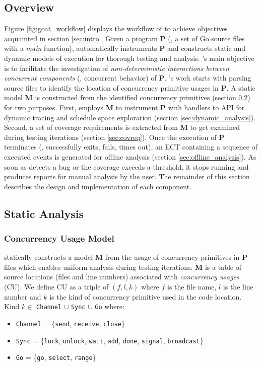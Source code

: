 \subsection{Overview}
\label{sec:overview}
Figure \ref{fig:goat_workflow} displays the workflow of \goat to achieve objectives acquainted in section \ref{sec:intro}.
%
Given a program \textbf{P} (\ie, a set of Go source files with a \textit{main} function), \goat automatically instruments \textbf{P} and constructs static and dynamic models of execution for thorough testing and analysis.
%
\goat's main objective is to facilitate the investigation of \textit{non-deterministic interactions between concurrent components} (\ie, concurrent behavior) of \textbf{P}.
%
\goat's work starts with parsing source files to identify the location of concurrency primitive usages in \textbf{P}.
%
A static model \textbf{M} is constructed from the identified concurrency primitives (section \ref{sec:static_analysis}) for two purposes.
%
First, \goat employs \textbf{M} to instrument \textbf{P} with handlers to \goat API for dynamic tracing and schedule space exploration (section \ref{sec:dynamic_analysis}).
%
Second, a set of coverage requirements is extracted from \textbf{M} to get examined during testing iterations (section \ref{sec:covreq}).
%
Once the execution of \textbf{P} terminates (\eg, successfully exits, fails, times out), an ECT containing a sequence of executed events is generated for offline analysis (section \ref{sec:offline_analysis}).
%
As soon as \goat detects a bug or the coverage exceeds a threshold, it stops running and produces reports for manual analysis by the user.
%
The remainder of this section describes the design and implementation of each component.

\subsection{Static Analysis}
\label{sec:static_analysis}

\subsubsection{Concurrency Usage Model}
\goat statically constructs a model \textbf{M} from the usage of concurrency primitives in \textbf{P} files which enables uniform analysis during testing iterations.
%
\textbf{M} is a table of source locations (files and line numbers) associated with \textit{concurrency usages} (CU).
%
We define CU as a triple of $(f,l,k)$ where $f$ is the file name, $l$ is the line number and $k$ is the kind of concurrency primitive used in the code location.
Kind $k\in$ \texttt{Channel} $\cup$ \texttt{Sync} $\cup$ \texttt{Go} where:
\begin{itemize}
  \item \texttt{Channel} = \{\texttt{send}, \texttt{receive}, \texttt{close}\}
  \item \texttt{Sync} = \{\texttt{lock}, \texttt{unlock}, \texttt{wait}, \texttt{add}, \texttt{done}, \texttt{signal}, \texttt{broadcast}\}
  \item \texttt{Go} = \{\texttt{go}, \texttt{select}, \texttt{range}\}
\end{itemize}

